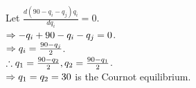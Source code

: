 \begin{pr}
Let $\frac{d(90-q_i-q_j)q_i}{dq_i}=0$.\\
$\Rightarrow-q_i+90-q_i-q_j=0$.\\
$\Rightarrow q_i=\frac{90-q_j}2$.\\
$\therefore q_1=\frac{90-q_2}2, q_2=\frac{90-q_1}2$.\\
$\Rightarrow q_1=q_2=30$ is the Cournot equilibrium.
\end{pr}
